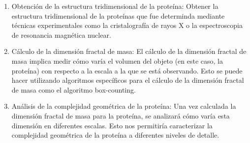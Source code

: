 \documentclass[11pt]{article}
\begin{document}
\begin{enumerate}
	
\item Obtenci\'{o}n de la estructura tridimensional de la prote\'{i}na: Obtener la estructura tridimensional de la prote\'{i}nas que fue determinda mediante t\'{e}cnicas experimentales como la cristalograf\'{i}a de rayos X o la espectroscopia de resonancia magn\'{e}tica nuclear.

\item C\'{a}lculo de la dimensi\'{o}n fractal de masa: El c\'{a}lculo de la dimensi\'{o}n fractal de masa implica medir c\'{o}mo var\'{i}a el volumen del objeto (en este caso, la prote\'{i}na) con respecto a la escala a la que se est\'{a} observando. Esto se puede hacer utilizando algoritmos espec\'{i}ficos para el c\'{a}lculo de la dimensi\'{o}n fractal de masa como el algoritmo box-counting.

\item An\'{a}lisis de la complejidad geom\'{e}trica de la prote\'{i}na: Una vez calculada la dimensi\'{o}n fractal de masa para la prote\'{i}na, se analizar\'{a} c\'{o}mo var\'{i}a esta dimensi\'{o}n en diferentes escalas. Esto nos permitir\'{i}a caracterizar la complejidad geom\'{e}trica de la prote\'{i}na a diferentes niveles de detalle.

\end{enumerate}

\clearpage
\end{document}
